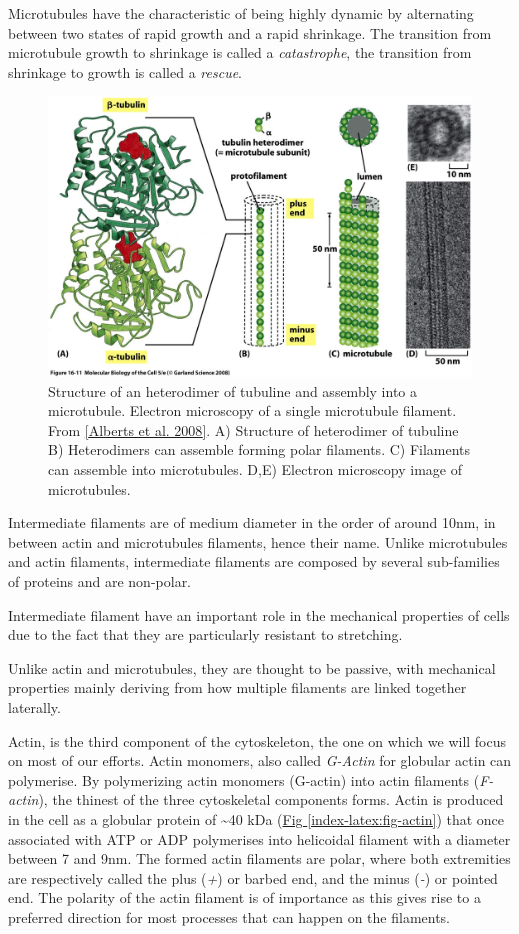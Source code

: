\documentclass[A4paperpaper,11pt,english]{sphinxmanual}
\begin{document}
Microtubules have the characteristic of being highly dynamic by alternating
between two states of rapid growth and a rapid shrinkage. The transition from
microtubule growth to shrinkage is called a \emph{catastrophe}, the transition from
shrinkage to growth is called a \emph{rescue}.
\begin{figure}[htbp]
\centering
\capstart

\includegraphics[width=0.700\linewidth]{microtubules-structure.jpg}
\caption{Structure of an heterodimer of tubuline and assembly into a microtubule.
Electron microscopy of a single microtubule filament. From {\hyperref[index-latex:alberts2008]{{[}Alberts et al. 2008{]}}}.
A) Structure of heterodimer of tubuline B)
Heterodimers can assemble forming polar filaments. C) Filaments can
assemble into  microtubules. D,E) Electron microscopy image of
microtubules.}\label{index-latex:fig-mt}\end{figure}

Intermediate filaments are of medium diameter in the order of around 10nm, in
between actin and microtubules filaments, hence their name.  Unlike microtubules
and actin filaments, intermediate filaments are composed by several sub-families
of proteins and are non-polar.

Intermediate filament have an important role in the mechanical properties of
cells due to the fact that they are particularly  resistant to stretching.

Unlike actin and microtubules, they are thought to be passive, with mechanical
properties mainly deriving from how multiple filaments are linked together
laterally.

Actin, is the third component of the cytoskeleton, the one on which  we will
focus on most of our efforts. Actin monomers, also called \emph{G-Actin} for globular actin can polymerise.
By polymerizing actin monomers (G-actin) into actin filaments (\emph{F-actin}), the
thinest of the three cytoskeletal components forms. Actin is produced in the
cell as a globular protein of \textasciitilde{}40 kDa (\hyperref[index-latex:fig-actin]{Fig  \ref*{index-latex:fig-actin}}) that once associated with ATP or ADP
polymerises into helicoidal filament with a diameter between 7 and 9nm. The
formed actin filaments are polar, where both extremities are respectively called the
plus (\emph{+}) or barbed end, and the minus (\emph{-}) or pointed end. The polarity of
the actin filament is of importance as this gives rise to a preferred direction
for most processes that can happen on the filaments.
\end{document}
